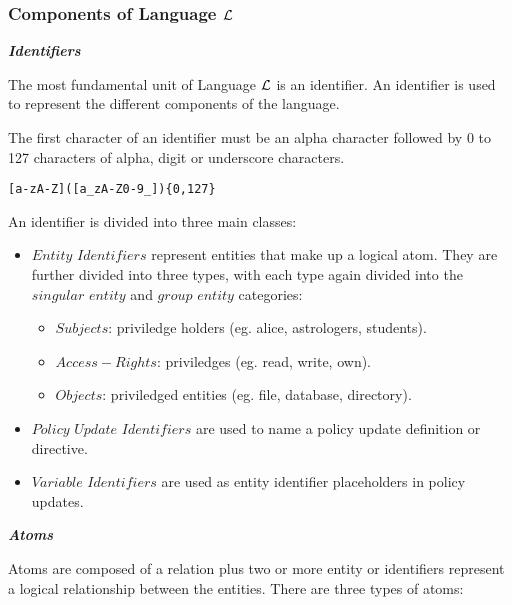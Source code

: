 \documentclass[10pt, twocolumn]{article}
\begin{document}
      \subsubsection{Components of Language $\cal{L}$}

        \noindent \textbf{\emph{Identifiers}}

          The most fundamental unit of Language $\cal{L}$ is an identifier. An
          identifier is used to represent the different components of the
          language. 
    
          The first character of an identifier must be an alpha character
          followed by 0 to 127 characters of alpha, digit or underscore
          characters.

          \begin{verbatim}[a-zA-Z]([a_zA-Z0-9_]){0,127}\end{verbatim}

          An identifier is divided into three main classes:

          \begin{itemize}
            \item
              $Entity$ $Identifiers$ represent entities that make up a logical
              atom. They are further divided into three types, with each type
              again divided into the $singular$ $entity$ and $group$ $entity$
              categories:
              \begin{itemize}
                \item
                  $Subjects$: priviledge holders (eg. alice, astrologers,
                  students).
                \item
                  $Access-Rights$: priviledges (eg. read, write, own).
                \item
                  $Objects$: priviledged entities (eg. file, database,
                  directory).
              \end{itemize}
            \item
              $Policy$ $Update$ $Identifiers$ are used to name a policy
              update definition or directive.
            \item
              $Variable$ $Identifiers$ are used as entity identifier
              placeholders in policy updates.
          \end{itemize}

        \noindent \textbf{\emph{Atoms}}
 
          Atoms are composed of a relation plus two or more entity or
          identifiers represent a logical relationship between the entities.
          There are three types of atoms:
\end{document}
